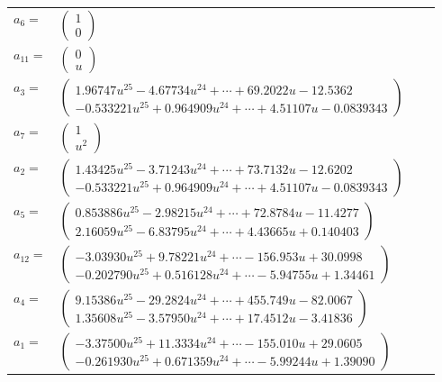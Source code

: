 \documentclass[1p]{elsarticle_modified}
\theoremstyle{definition}
\begin{document}
\begin{tabular}{m{7pt} m{180pt} m{7pt} m{180pt} }
\flushright $a_{6}=$&$\begin{pmatrix}1\\0\end{pmatrix}$ \\
\flushright $a_{11}=$&$\begin{pmatrix}0\\u\end{pmatrix}$ \\
\flushright $a_{3}=$&$\begin{pmatrix}1.96747 u^{25}-4.67734 u^{24}+\cdots+69.2022 u-12.5362\\-0.533221 u^{25}+0.964909 u^{24}+\cdots+4.51107 u-0.0839343\end{pmatrix}$ \\
\flushright $a_{7}=$&$\begin{pmatrix}1\\u^2\end{pmatrix}$ \\
\flushright $a_{2}=$&$\begin{pmatrix}1.43425 u^{25}-3.71243 u^{24}+\cdots+73.7132 u-12.6202\\-0.533221 u^{25}+0.964909 u^{24}+\cdots+4.51107 u-0.0839343\end{pmatrix}$ \\
\flushright $a_{5}=$&$\begin{pmatrix}0.853886 u^{25}-2.98215 u^{24}+\cdots+72.8784 u-11.4277\\2.16059 u^{25}-6.83795 u^{24}+\cdots+4.43665 u+0.140403\end{pmatrix}$ \\
\flushright $a_{12}=$&$\begin{pmatrix}-3.03930 u^{25}+9.78221 u^{24}+\cdots-156.953 u+30.0998\\-0.202790 u^{25}+0.516128 u^{24}+\cdots-5.94755 u+1.34461\end{pmatrix}$ \\
\flushright $a_{4}=$&$\begin{pmatrix}9.15386 u^{25}-29.2824 u^{24}+\cdots+455.749 u-82.0067\\1.35608 u^{25}-3.57950 u^{24}+\cdots+17.4512 u-3.41836\end{pmatrix}$ \\
\flushright $a_{1}=$&$\begin{pmatrix}-3.37500 u^{25}+11.3334 u^{24}+\cdots-155.010 u+29.0605\\-0.261930 u^{25}+0.671359 u^{24}+\cdots-5.99244 u+1.39090\end{pmatrix}$ \\

\end{tabular}
\end{document}
